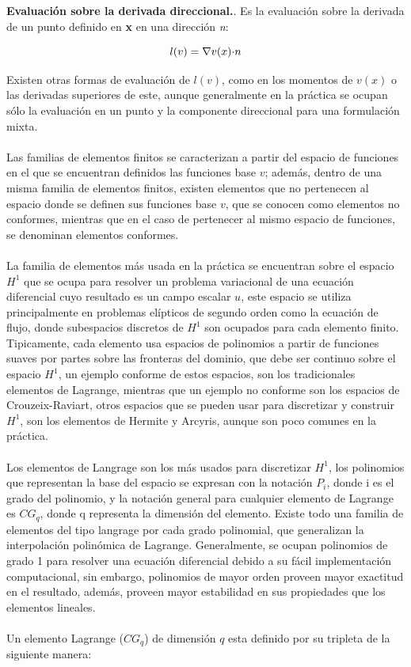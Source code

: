 \textbf{Evaluación sobre la derivada direccional.}. Es la evaluación sobre la derivada de un punto definido en \textbf{x} en una dirección \textit{n}:

\begin{equation}
\label{eqn:fe25}
    \\l(v)=  {\nabla}v(x){\cdot}n            
\end{equation}

Existen otras formas de evaluación de $l(v)$, como en los momentos de $v(x)$ o las derivadas superiores de este, aunque generalmente en la práctica se ocupan sólo la evaluación en un punto y la componente direccional para una formulación mixta.
\\
\\
Las familias de elementos finitos se caracterizan a partir del espacio de funciones en el que se encuentran definidos las funciones base $v$; además, dentro de una misma familia de elementos finitos, existen elementos que no pertenecen al espacio donde se definen sus funciones base $v$, que se conocen como elementos no conformes, mientras que en el caso de pertenecer al mismo espacio de funciones, se denominan elementos conformes.
\\
\\
La familia de elementos más usada en la práctica se encuentran sobre el espacio $H^{1}$ que se ocupa para resolver un problema variacional de una ecuación diferencial cuyo resultado es un campo escalar $u$, este espacio se utiliza principalmente en problemas elípticos de segundo orden como la ecuación de flujo, donde subespacios discretos de $H^{1}$ son ocupados para cada elemento finito. Tipicamente, cada elemento usa espacios de polinomios a partir de funciones suaves por partes sobre las fronteras del dominio, que debe ser continuo sobre el espacio $H^{1}$, un ejemplo conforme de estos espacios, son los tradicionales elementos de Lagrange, mientras que un ejemplo no conforme son los espacios de Crouzeix-Raviart, otros espacios que se pueden usar para discretizar y construir $H^{1}$, son los elementos de Hermite y Arcyris, aunque son poco comunes en la práctica.
\\
\\
Los elementos de Langrage son los más usados para discretizar $H^{1}$, los polinomios que representan la base del espacio se expresan con la notación $P_{i}$, donde i es el grado del polinomio, y la notación general para cualquier elemento de Lagrange es $CG_{q}$, donde q representa la dimensión del elemento. Existe todo una familia de elementos del tipo langrage por cada grado polinomial, que generalizan la interpolación polinómica de Lagrange. Generalmente, se ocupan polinomios de grado 1 para resolver una ecuación diferencial debido a su fácil implementación computacional, sin embargo, polinomios de mayor orden proveen mayor exactitud en el resultado, además, proveen mayor estabilidad en sus propiedades que los elementos lineales.
\\
\\
Un elemento Lagrange ($CG_{q}$) de  dimensión $q$ esta definido por su tripleta de la siguiente manera:

